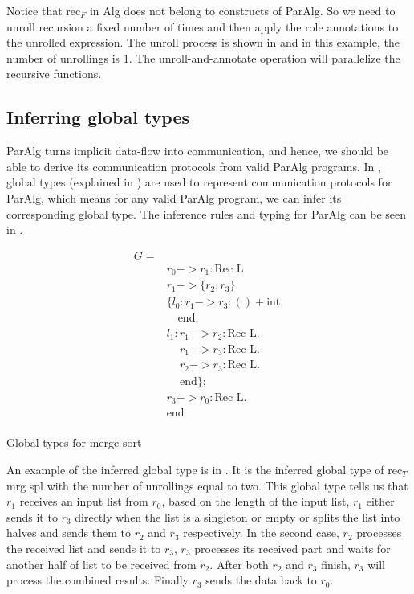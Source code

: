 Notice that $\text{rec}_F$ in Alg does not belong to constructs of ParAlg. So we need to unroll recursion a fixed number of times and then apply the role annotations to the unrolled expression. The unroll process is shown in  and in this example, the number of unrollings is 1. The unroll-and-annotate operation will parallelize the recursive functions.
\subsection{Inferring global types}
ParAlg turns implicit data-flow into communication, and hence, we should be able to derive its communication protocols from valid ParAlg programs. In \cite{castroAlgebraicMultipartyProtocol}, global types (explained in ) are used to represent communication protocols for ParAlg, which means for any valid ParAlg program, we can infer its corresponding global type. The inference rules and typing for ParAlg can be seen in \cite{castroAlgebraicMultipartyProtocol}. 
\begin{listing}[ht]
    \begin{align*}
       G = \\ 
       & r_0 -> r_1: \text{Rec L} \\
       & r_1 -> \{r_2, r_3\}\\
       & \{ l_0 : r_1 -> r_3 : () + \text{int}.\\
       & \quad \text{end};\\
       &  l_1 :  r_1 -> r_2 : \text{Rec L}.\\
       &  \,\quad  r_1 -> r_3 : \text{Rec L}.\\
       &  \,\quad  r_2 -> r_3 : \text{Rec L}.\\
       &  \,\quad  \text{end} \}; \\
       & r_3 -> r_0 : \text{Rec L}.\\
       & \text{end}\\
    \end{align*}
    \caption{Global types for merge sort}
    \label{project:code:ms2}
\end{listing}

An example of the inferred global type is in . It is the inferred global type of $\text{rec}_T$ mrg spl with the number of unrollings equal to two. This global type tells us that $r_1$ receives an input list from $r_0$, based on the length of the input list, $r_1$ either sends it to $r_3$ directly when the list is a singleton or empty or splits the list into halves and sends them to $r_2$ and $r_3$ respectively. In the second case, $r_2$ processes the received list and sends it to $r_3$, $r_3$ processes its received part and waits for another half of list to be received from $r_2$. After both $r_2$ and $r_3$ finish, $r_3$ will process the combined results. Finally $r_3$ sends the data back to $r_0$.

